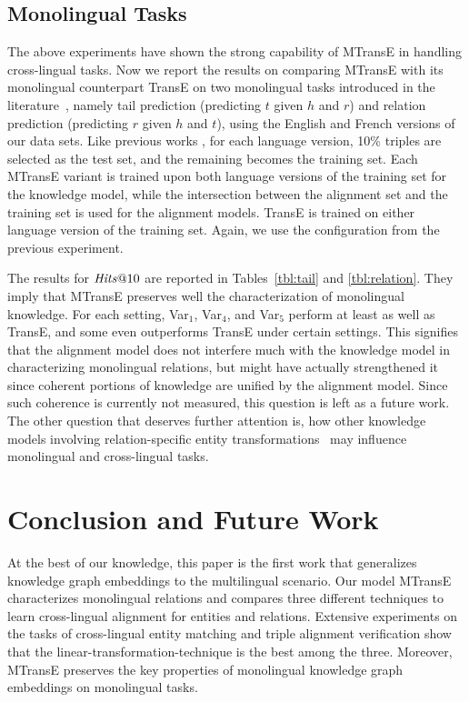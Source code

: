 \documentclass{article}
\def\inv{\vspace{-0.1cm}}
\begin{document}
\inv
\subsection{Monolingual Tasks}
The above experiments have shown the strong capability of MTransE in handling cross-lingual tasks. Now we report the results on comparing MTransE with its monolingual counterpart TransE on two monolingual tasks introduced in the literature~\cite{bordes2013translating,bordes2014open}, namely tail prediction (predicting $t$ given $h$ and $r$) and relation prediction (predicting $r$ given $h$ and $t$), using the English and French versions of our data sets.
Like previous works \cite{bordes2013translating,wang2014knowledge,jia2016locally},
for each language version, 10\% triples are selected as the test set, and the remaining becomes the training set. Each MTransE variant is trained upon both language versions of the training set for the knowledge model, while the intersection between the alignment set and the training set is used for the alignment models. TransE is trained on either language version of the training set. Again, we use the configuration from the previous experiment. \par



 The results for $\mathit{Hits}\mbox{@}10$ are reported in Tables~\ref{tbl:tail} and \ref{tbl:relation}.
They imply that MTransE preserves well the characterization of monolingual knowledge. For each setting, Var$_1$, Var$_4$, and Var$_5$ perform at least as well as TransE, and some even outperforms TransE under certain settings. This signifies that the alignment model does not interfere much with the knowledge model in characterizing monolingual relations,
but might have actually strengthened it since coherent portions of knowledge are unified by the alignment model.
\mbox{Since} such coherence is currently not measured, this question is left as a future work.
The other question that deserves further attention is,
how other knowledge models involving relation-specific entity transformations~\cite{wang2014knowledge,lin2015learning,ji2015knowledge,jia2016locally,nguyenstranse} may influence monolingual and cross-lingual tasks.


\inv
\section{Conclusion and Future Work}
At the best of our knowledge, this paper is the first work that
generalizes knowledge graph embeddings to the multilingual scenario.
Our model MTransE characterizes monolingual relations and compares three different techniques to learn cross-lingual alignment for entities and \mbox{relations}.
Extensive experiments on the tasks of cross-lingual \mbox{entity} matching and triple alignment verification show that the linear-transformation-technique is the best among the three. Moreover,
MTransE preserves the key properties of monolingual knowledge graph embeddings on monolingual tasks. \par
\end{document}
